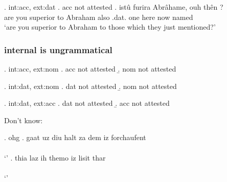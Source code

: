  \ex. \ac{int}:\ac{acc}, \ac{ext}:\ac{dat}
 \a. \ac{acc} not attested
 \bg. istû furira Abrâhame, ouh thên    ?\\
  {are you} superior\scsub{[dat]} {to Abraham} also .\ac{dat}. one here now named\scsub{[acc]}\\
  `are you superior to Abraham to those which they just mentioned?' 


  \subsubsection{internal is ungrammatical}

  \ex. \ac{int}:\ac{acc}, \ac{ext}:\ac{nom}
  \a. \ac{acc} not attested
  \b. \ac{nom} not attested

 \ex. \ac{int}:\ac{dat}, \ac{ext}:\ac{nom}
 \a. \ac{dat} not attested
 \b. \ac{nom} not attested

 \ex. \ac{int}:\ac{dat}, \ac{ext}:\ac{acc}
 \a. \ac{dat} not attested
 \b. \ac{acc} not attested


 Don't know:

 \ex. \ac{ohg}
 \ag. gaat uz diu halt za dem iz forchaufent\\
  \\
  `' 
 \bg. thia laz ih themo iz lisit thar\\
  \\
  `' 

